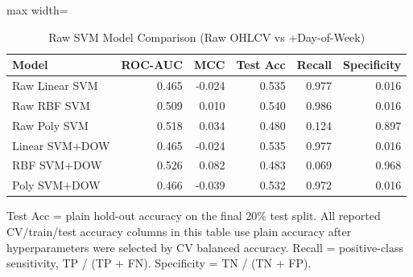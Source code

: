 \begin{table}[htbp]
\centering
\caption{Raw SVM Model Comparison (Raw OHLCV vs +Day-of-Week)}
\label{tab:base_svm_comparison}
\begin{adjustbox}{max width=\linewidth}
\begin{tabular}{lrrrrr}
\toprule
Model & ROC-AUC & MCC & Test Acc & Recall & Specificity \\
\midrule
Raw Linear SVM & 0.465 & -0.024 & 0.535 & 0.977 & 0.016 \\
Raw RBF SVM & 0.509 & 0.010 & 0.540 & 0.986 & 0.016 \\
Raw Poly SVM & 0.518 & 0.034 & 0.480 & 0.124 & 0.897 \\
Linear SVM+DOW & 0.465 & -0.024 & 0.535 & 0.977 & 0.016 \\
RBF SVM+DOW & 0.526 & 0.082 & 0.483 & 0.069 & 0.968 \\
Poly SVM+DOW & 0.466 & -0.039 & 0.532 & 0.972 & 0.016 \\
\bottomrule
\end{tabular}
\end{adjustbox}
\par\smallskip
\footnotesize Test Acc = plain hold-out accuracy on the final 20\% test split. All reported CV/train/test accuracy columns in this table use plain accuracy after hyperparameters were selected by CV balanced accuracy. Recall = positive-class sensitivity, TP / (TP + FN). Specificity = TN / (TN + FP).
\end{table}
